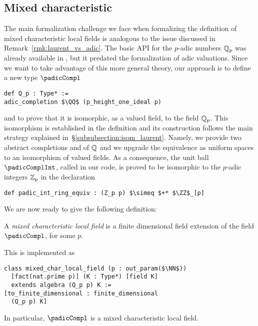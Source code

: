 \documentclass[sigplan,10pt,anonymous,review]{acmart}
\begin{document}
\subsection{Mixed characteristic}\label{subsec:mixed_char}
The main formalization challenge we face when formalizing the definition of mixed characteristic local fields is analogous to the issue discussed in Remark~\ref{rmk:laurent_vs_adic}. The basic API for the $p$-adic numbers $\mathbb{Q}_p$ was already available in \mathlib, but it predated the formalization of adic valuations. Since we want to take advantage of this more general theory, our approach is to define a new type $\padicCompl$\href{https://github.com/LCFT-Lean/local_fields/blob/76ad487d09babdb0018f394a5634526637ee014a/src/padic_compare.lean#L89}{\extlink}
\begin{lstlisting}
def Q_p : Type* := 
adic_completion $\QQ$ (p_height_one_ideal p)
\end{lstlisting}
and to prove that it is isomorphic, as a valued field, to the field $\mathbb{Q}_p$. This isomorphism is established in the definition \href{https://github.com/LCFT-Lean/local_fields/blob/76ad487d09babdb0018f394a5634526637ee014a/src/padic_compare.lean#L268}{\extlink} and its construction follows the main strategy explained in~\S\ref{subsubsection:isom_laurent}. Namely, we provide two abstract completions  and  of $\mathbb{Q}$ and we upgrade the equivalence as uniform spaces to an isomorphism of valued fields. As a consequence, the unit ball $\padicComplInt$, called\href{https://github.com/LCFT-Lean/local_fields/blob/76ad487d09babdb0018f394a5634526637ee014a/src/padic_compare.lean#L326}{\extlink}  in our code,
is proved to be isomorphic to the $p$-adic integers $\mathbb{Z}_p$ in the declaration\href{https://github.com/LCFT-Lean/local_fields/blob/76ad487d09babdb0018f394a5634526637ee014a/src/padic_compare.lean#L567}{\extlink}
\begin{lstlisting}[caption={The isomorphism between $\padicComplInt$ and $\ZZ_p$}, label={code:iso_Zp}]
def padic_int_ring_equiv : (Z_p p) $\simeq $+* $\ZZ$_[p]
\end{lstlisting}

We are now ready to give the following definition:
\begin{definition}\label{def:mixed_char_local_field}
A \emph{mixed characteristic local field} is a finite dimensional field extension of the field $\padicCompl$, for some $p$.
\end{definition}
This is implemented as\href{https://github.com/LCFT-Lean/local_fields/blob/76ad487d09babdb0018f394a5634526637ee014a/src/mixed_characteristic/basic.lean#L36}{\extlink}
\begin{lstlisting}
class mixed_char_local_field (p : out_param($\NN$))
  [fact(nat.prime p)] (K : Type*) [field K]
  extends algebra (Q_p p) K :=
[to_finite_dimensional : finite_dimensional
  (Q_p p) K]    
\end{lstlisting}
In particular, $\padicCompl$ is a mixed characteristic local field\href{https://github.com/LCFT-Lean/local_fields/blob/76ad487d09babdb0018f394a5634526637ee014a/src/mixed_characteristic/basic.lean#L123}{\extlink}.
\end{document}
